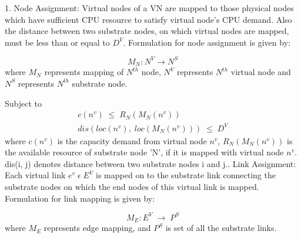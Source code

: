 \documentclass[article,dr=phil,type=msc ,colorback,accentcolor=tud4b]{tudthesis}
\begin{document}
1. Node Assignment: Virtual nodes of a VN are mapped to those physical nodes which have sufficient CPU resource to satisfy virtual node's CPU demand. Also the distance between two substrate nodes, on which virtual nodes are mapped, must be less than or equal to $D^{V}$. Formulation for node assignment is given by:

\begin{equation}
M_{N}: N^{V} \rightarrow N^{S}
\end{equation}
where $M_{N}$ represents mapping of $N^{th}$ node, $N^{V}$ represents  $N^{th}$ virtual node and $N^{S}$ represents  $N^{th}$ substrate node.\newline

Subject to 
\begin{equation}
\begin{split}
c(n^{v})  \;\leq \; R_{N}(M_{N}(n^{v})) \\
dis(loc(n^{v}) , \;loc(M_{N}(n^{v})) ) \; \leq\; D^{V}
\end{split}
\end{equation}
where $c(n^{v})$ is the capacity demand from virtual node $n^{v}$, \;$R_{N}(M_{N}(n^{v}))$ is the available resource of substrate node 'N', if it is mapped with virtual node $n^{v}$. dis(i, j) denotes distance between two substrate nodes i and j.. Link Assignment: Each virtual link $e^{v} \;\epsilon \;E^{V}$ is mapped on to the substrate link connecting the substrate nodes on which the end nodes of this virtual link is mapped. Formulation for link mapping is given by:\newline

\begin{equation}
M_{E}: E^{V} \;\rightarrow \;P^{S}
\end{equation}
where $M_{E}$ represents edge mapping, and $P^{S}$ is set of all the substrate links.\newline
\end{document}
